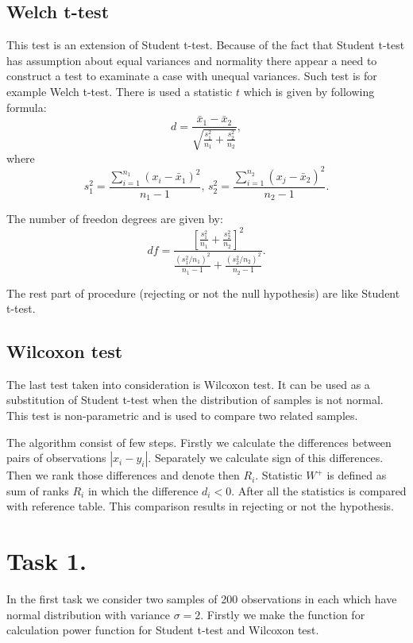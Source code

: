 \documentclass{article}
\begin{document}
  \subsection{Welch t-test}
This test is an extension of Student t-test. Because of the fact that Student t-test has assumption about equal variances and normality there appear a need to construct a test to examinate a case with unequal variances. Such test is for example Welch t-test. There is used a statistic $t$ which is given by following formula:
  \begin{equation}
     d=\dfrac{\bar{x}_1-\bar{x}_2}{\sqrt{\frac{s_1^2}{n_1}+\frac{s_2^2}{n_2}}},
  \end{equation}
where 
  \begin{equation}
     s_1^2=\dfrac{\sum\limits_{i=1}^{n_1}(x_i-\bar{x}_1)^2}{n_1-1},\, s_2^2=\dfrac{\sum\limits_{i=1}^{n_2}(x_j-\bar{x}_2)^2}{n_2-1}.
  \end{equation}

The number of freedon degrees are given by:
  \begin{equation}
     df=\dfrac{\left[\frac{s_1^2}{n_1}+\frac{s_2^2}{n_2}\right]^2}{\frac{(s_1^2/n_1)^2}{n_1-1}+\frac{(s_2^2/n_2)^2}{n_2-1}}.
  \end{equation}
  
The rest part of procedure (rejecting or not the null hypothesis) are like Student t-test.

  \subsection{Wilcoxon test}
The last test taken into consideration is Wilcoxon test. It can be used as a substitution of Student t-test when the distribution of samples is not normal. This test is non-parametric and is used to compare two related samples.

  The algorithm consist of few steps. Firstly we calculate the differences between pairs of observations $|x_i-y_i|$. Separately we calculate sign of this differences. Then we rank those differences and denote then $R_i$. Statistic $W^+$ is defined as sum of ranks $R_i$ in which the difference $d_i<0$. After all the statistics is compared with reference table. This comparison results in rejecting or not the hypothesis.


  \section{Task 1.}
In the first task we consider two samples of 200 observations in each which have normal distribution with variance $\sigma=2$.
  Firstly we make the function for calculation power function for Student t-test and Wilcoxon test.
 
\end{document}
